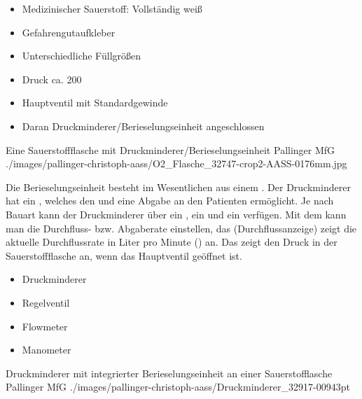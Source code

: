 {%
\begin{itemize}
  \item Medizinischer Sauerstoff: Vollständig weiß
  \item Gefahrengutaufkleber
  \item Unterschiedliche Füllgrößen
  \item Druck ca. 200\Bar*
  \item Hauptventil mit Standardgewinde
  \item Daran Druckminderer/Berieselungseinheit
  angeschlossen
\end{itemize}
}
{}
{}
{}

\begin{Synopsis}
\end{Synopsis}




\Picture
{Eine Sauerstoffflasche mit
Druckminderer/Berieselungseinheit}%
{}%
{}%
{Pallinger}%
{MfG}%
{./images/pallinger-christoph-aass/O2_Flasche_32747-crop2-AASS-0176mm.jpg}%
{}%
{}%




{
Die Berieselungseinheit besteht im Wesentlichen aus einem
. Der Druckminderer hat ein
, welches den  und eine
Abgabe an den Patienten ermöglicht. Je nach Bauart kann der
Druckminderer über ein , ein
 und ein 
verfügen.  Mit dem  kann man die Durchfluss-
bzw. Abgaberate ein\-stellen,  das 
(Durchflussanzeige) zeigt die aktuelle Durchflussrate in 
Liter pro Minute (\LPerMin) an. Das   zeigt den
Druck in der Sauerstoffflasche an, wenn das Hauptventil
geöffnet ist.}
{
\begin{itemize}
  \item Druckminderer
  \item Regelventil
  \item Flowmeter  \LPerMin
  \item Manometer  \Bar
\end{itemize}
}
{}
{}
{}


\Picture
{Druckminderer mit integrierter Berieselungseinheit an einer Sauerstofflasche}%
{}%
{}%
{Pallinger}%
{MfG}%
{./images/pallinger-christoph-aass/Druckminderer_32917-00943pt}%
{}%
{}%





